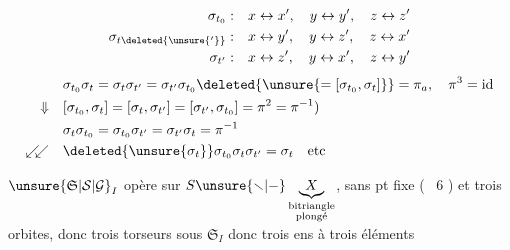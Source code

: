 \[
\begin{aligned}
\sigma_{t_0}:&\quad x\leftrightarrow x',\quad y\leftrightarrow y',\quad z\leftrightarrow z'\\
\sigma_{t\deleted{\unsure{'}}}:&\quad x\leftrightarrow y',\quad y\leftrightarrow z',\quad z\leftrightarrow x'\\
\sigma_{t'}:&\quad x\leftrightarrow z',\quad y\leftrightarrow x',\quad z\leftrightarrow y'
\end{aligned}
\]
\[
\begin{aligned}
&\sigma_{t_0}\sigma_t=\sigma_t\sigma_{t'}=\sigma_{t'}\sigma_{t_0}\deleted{\unsure{=[\sigma_{t_0},\sigma_t]}}=\pi_{a},\quad\pi^3=\mathrm{id}\\
\Downarrow\quad&[\sigma_{t_0},\sigma_t]=[\sigma_t,\sigma_{t'}]=[\sigma_{t'},\sigma_{t_0}]=\pi^2=\pi^{-1})\\
&\sigma_t\sigma_{t_0}=\sigma_{t_0}\sigma_{t'}=\sigma_{t'}\sigma_t=\pi^{-1}\\
\mathrel{\swarrow\!\!\swarrow}\quad&\deleted{\unsure{\sigma_t}}\sigma_{t_0}\sigma_t\sigma_{t'}=\sigma_t\quad\text{etc}
\end{aligned}
\]

$\unsure{\mathfrak S|\mathcal S|\mathcal G}_I$ opère sur $S\unsure{\smallsetminus|-}\underbrace{X}_{\substack{\text{bitriangle}\\\text{plongé}}}$, sans pt fixe (\  6 ) et \unsure{---} trois orbites, donc trois torseurs sous $\mathfrak S_I$ donc trois ens à trois éléments

